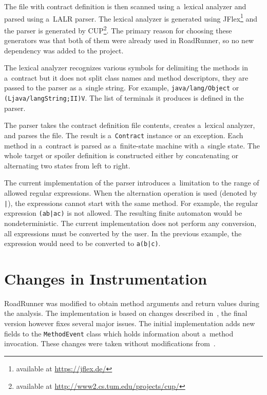 The file with contract definition is then scanned using a~lexical analyzer and
parsed using a~LALR parser. The lexical analyzer is generated using
JFlex\footnote{available at \url{https://jflex.de/}} and the parser is generated
by CUP\footnote{available at \url{http://www2.cs.tum.edu/projects/cup/}}. The
primary reason for choosing these generators was that both of them were already
used in RoadRunner, so no new dependency was added to the project.

The lexical analyzer recognizes various symbols for delimiting the methods in
a~contract but it does not split class names and method descriptors, they are
passed to the parser as a~single string. For example, \texttt{java/lang/Object}
or \texttt{(Ljava/langString;II)V}. The list of terminals it produces is defined
in the parser.

The parser takes the contract definition file contents, creates a~lexical
analyzer, and parses the file. The result is a~\texttt{Contract} instance or an
exception. Each method in a~contract is parsed as a~finite-state machine with
a~single state. The whole target or spoiler definition is constructed either by
concatenating or alternating two states from left to right.

The current implementation of the parser introduces a~limitation to the range of
allowed regular expressions. When the alternation operation is used (denoted by
\texttt{|}), the expressions cannot start with the same method. For example, the
regular expression \texttt{(ab|ac)} is not allowed. The resulting finite
automaton would be nondeterministic. The current implementation does not perform
any conversion, all expressions must be converted by the user. In the previous
example, the expression would need to be converted to \texttt{a(b|c)}.

\section{Changes in Instrumentation}
\label{instrImpl}
RoadRunner was modified to obtain method arguments and return values during the
analysis. The implementation is based on changes described in~\cite{janousek},
the final version however fixes several major issues. The initial implementation
adds new fields to the \texttt{MethodEvent} class which holds information about
a~method invocation. These changes were taken without modifications
from~\cite{janousek}.

